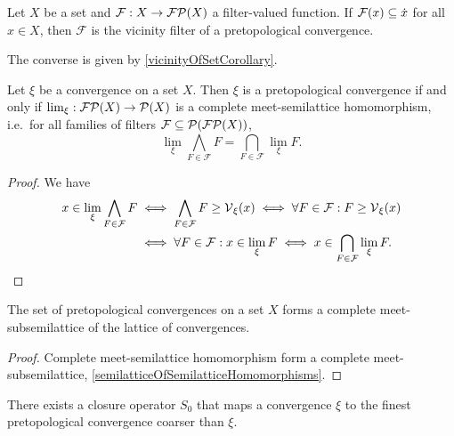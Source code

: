 \begin{lemma} \label{filterFunctionToPretopology}
Let $X$ be a set and $\mathcal{F}:X\to \operatorname{\mathcal{FP}}(X)$ a filter-valued function. If $\mathcal{F}(x) \subseteq \dot{x}$ for all $x\in X$, then $\mathcal{F}$ is the vicinity filter of a pretopological convergence.
\end{lemma}
The converse is given by \ref{vicinityOfSetCorollary}.

\begin{proposition}
Let $\xi$ be a convergence on a set $X$. Then $\xi$ is a pretopological convergence \textup{if and only if} $\lim_\xi: \operatorname{\mathcal{FP}}(X)\to \operatorname{\mathcal{P}}(X)$ is a complete meet-semilattice homomorphism, i.e.\
for all families of filters $\mathcal{F} \subseteq \operatorname{\mathcal{P}}(\operatorname{\mathcal{FP}}(X))$,
\[ \lim_\xi \bigwedge_{F\in \mathcal{F}}F = \bigcap_{F\in\mathcal{F}}\lim_\xi F. \] 
\end{proposition}
\begin{proof}
We have
\begin{align*}
x\in \lim_\xi \bigwedge_{F\in \mathcal{F}}F &\iff \bigwedge_{F\in \mathcal{F}}F \geq \operatorname{\mathcal{V}}_\xi(x) \iff \forall F\in\mathcal{F}: F\geq \operatorname{\mathcal{V}}_\xi(x) \\
&\iff \forall F\in \mathcal{F}: x\in\lim_\xi F \iff x\in \bigcap_{F\in\mathcal{F}}\lim_\xi F.
\end{align*}
\end{proof}
\begin{corollary}
The set of pretopological convergences on a set $X$ forms a complete meet-subsemilattice of the lattice of convergences.
\end{corollary}
\begin{proof}
Complete meet-semilattice homomorphism form a complete meet-subsemilattice, \ref{semilatticeOfSemilatticeHomomorphisms}.
\end{proof}
\begin{corollary}
There exists a closure operator $S_0$ that maps a convergence $\xi$ to the finest pretopological convergence coarser than $\xi$.
\end{corollary}


